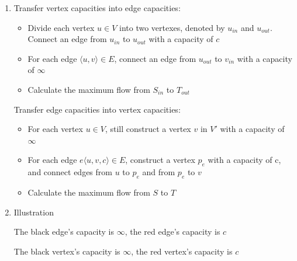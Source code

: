 \begin{enumerate}[(1)]
\item
	Transfer vertex capacities into edge capacities:
	\begin{itemize}
		\item Divide each vertex $u \in V$ into two vertexes, denoted by $u_{in}$ and $u_{out}$. Connect an edge from $u_{in}$ to $u_{out}$ with a capacity of $c$
		\item For each edge $\langle u, v \rangle \in E$, connect an edge from $u_{out}$ to $v_{in}$ with a capacity of $\infty$
		\item Calculate the maximum flow from $S_{in}$ to $T_{out}$
	\end{itemize}
	
	Transfer edge capacities into vertex capacities:
	\begin{itemize}
		\item For each vertex $u \in V$, still construct a vertex $v$ in $V'$ with a capacity of $\infty$
		\item For each edge $e\langle u, v, c\rangle \in E$, construct a vertex $p_e$ with a capacity of c, and connect edges from $u$ to $p_e$ and from $p_e$ to $v$
		\item Calculate the maximum flow from $S$ to $T$
	\end{itemize}
	\item Illustration
	
	The black edge's capacity is $\infty$, the red edge's capacity is $c$
	
	The black vertex's capacity is $\infty$, the red vertex's capacity is $c$
	

\end{enumerate}
